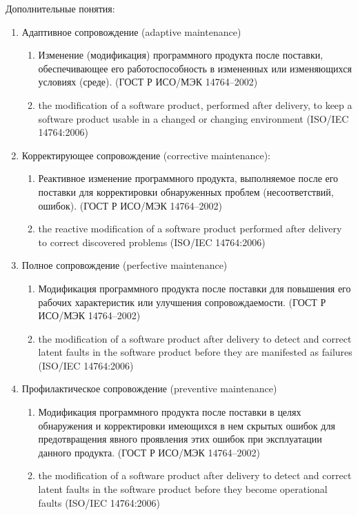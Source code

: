 Дополнительные понятия:
\begin{enumerate}
    \item Адаптивное сопровождение (adaptive maintenance)
    \begin{enumerate}
        \item Изменение (модификация) программного продукта после поставки, обеспечивающее его работоспособность в измененных или изменяющихся условиях (среде).
        (ГОСТ Р ИСО/МЭК 14764--2002)
        \item the modification of a software product, performed after delivery, to keep a software product usable in a changed or changing environment
        (ISO/IEC 14764:2006)
    \end{enumerate}

    \item Корректирующее сопровождение (corrective maintenance):
    \begin{enumerate}
        \item Реактивное изменение программного продукта, выполняемое после его поставки для корректировки обнаруженных проблем (несоответствий, ошибок).
        (ГОСТ Р ИСО/МЭК 14764--2002)
        \item the reactive modification of a software product performed after delivery to correct discovered problems
        (ISO/IEC 14764:2006)
    \end{enumerate}

    \item Полное сопровождение (perfective maintenance)
    \begin{enumerate}
        \item Модификация программного продукта после поставки для повышения его рабочих характеристик или улучшения сопровождаемости.
        (ГОСТ Р ИСО/МЭК 14764--2002)
        \item the modification of a software product after delivery to detect and correct latent faults in the software product before they are manifested as failures
        (ISO/IEC 14764:2006)
    \end{enumerate}

    \item Профилактическое сопровождение (preventive maintenance)
    \begin{enumerate}
        \item Модификация программного продукта после поставки в целях обнаружения и корректировки имеющихся в нем скрытых ошибок для предотвращения явного проявления этих ошибок при эксплуатации данного продукта.
        (ГОСТ Р ИСО/МЭК 14764--2002)
        \item the modification of a software product after delivery to detect and correct latent faults in the software product before they become operational faults
        (ISO/IEC 14764:2006)
    \end{enumerate}


\end{enumerate}
